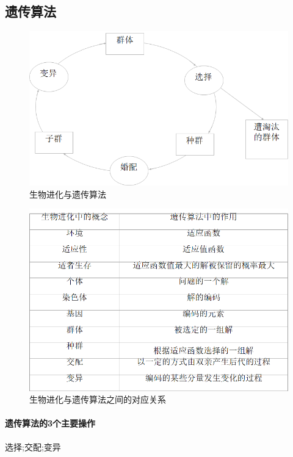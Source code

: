 \documentclass[UTF8,a4paper]{ctexart}
\begin{document}
\subsection{遗传算法}
\begin{figure}[H]
	\centering
	\includegraphics[scale = 0.5]{assets/ArtificialIntelligence/2018-01-09-14-25-06.png}
	\caption{生物进化与遗传算法 }
\end{figure}

\begin{figure}[H]
	\centering
	\includegraphics[scale = 0.5]{assets/ArtificialIntelligence/2018-01-09-14-25-26.png}
	\caption{生物进化与遗传算法之间的对应关系 }
\end{figure}

\paragraph{遗传算法的3个主要操作} 选择;交配;变异
\end{document}

